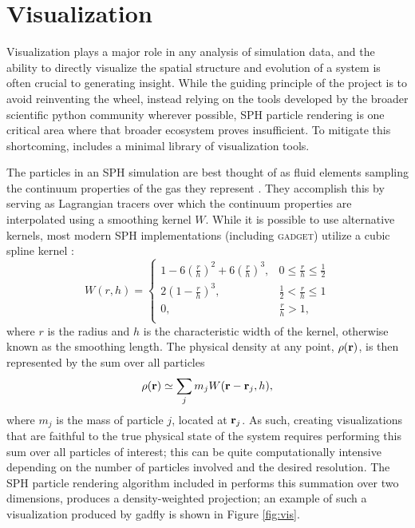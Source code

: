 \section{Visualization}
\label{sec:vis}
Visualization plays a major role in any analysis of simulation data, and the ability to directly visualize the spatial structure and evolution of a system is often crucial to generating insight.
While the guiding principle of the  project is to avoid reinventing the wheel, instead relying on the tools developed by the broader scientific python community wherever possible, SPH particle rendering is one critical area where that broader ecosystem proves insufficient.  
To mitigate this shortcoming,  includes a minimal library of visualization tools.

The particles in an SPH simulation are best thought of as fluid elements sampling the continuum properties of the gas they represent \citep{Lucy1977,GingoldMonaghan1977,Monaghan1992,Springel2010}.  They accomplish this by serving as Lagrangian tracers over which the continuum properties are interpolated using a smoothing kernel $W$. While it is possible to use alternative kernels, most modern SPH implementations (including \textsc{gadget}) utilize a cubic spline kernel \citep{Springel2014}: 
\begin{equation}
W(r,h) =
     \begin{cases}
       1 - 6 \left( \frac{r}{h} \right)^2 + 6 \left( \frac{r}{h} \right)^3, & 0 \leq \frac{r}{h} \leq \frac{1}{2}\\
       2 \left(1 - \frac{r}{h}\right)^3, & \frac{1}{2} < \frac{r}{h} \leq 1\\
       0, & \frac{r}{h} >  1,\\
     \end{cases}
\end{equation}
where $r$ is the radius and $h$ is the characteristic width of the kernel, otherwise known as the smoothing length.  The physical density at any point, $\rho(\bf{r})$, is then represented by the sum over all particles
\begin{equation}
\rho({\bf r}) \simeq \sum_j m_j W({\bf r} - {\bf r}_j, h),
\end{equation}
where $m_j$ is the mass of particle $j$, located at ${\bf r}_j$.
As such, creating visualizations that are faithful to the true physical state of the system requires performing this sum over all particles of interest; this can be quite computationally intensive depending on the number of particles involved and the desired resolution.
The SPH particle rendering algorithm included in  performs this summation over two dimensions, produces a density-weighted projection; an example of such a visualization produced by gadfly is shown in Figure \ref{fig:vis}.

